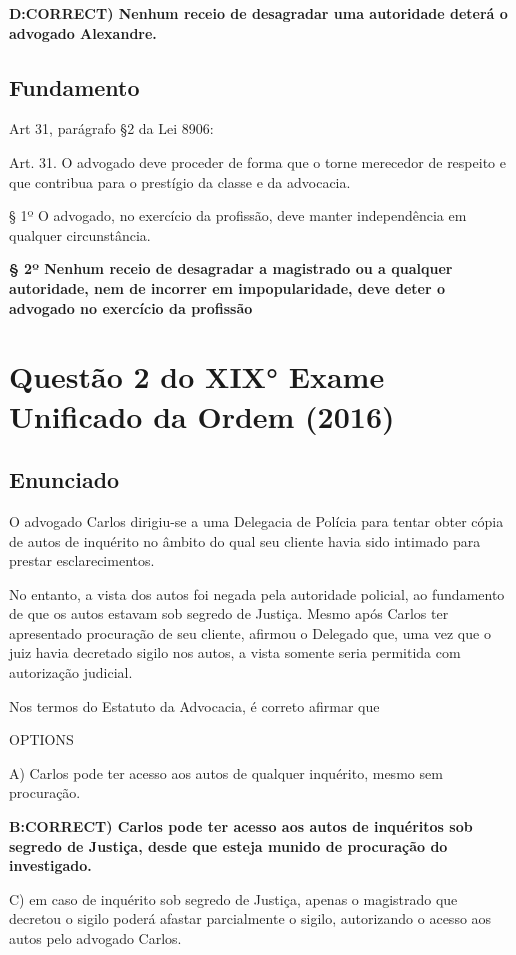 \documentclass[12pt]{article}
\begin{document}
\textbf{D:CORRECT) Nenhum receio de desagradar uma autoridade deterá o 
advogado Alexandre. }

\subsection{Fundamento}

Art 31, parágrafo §2 da Lei 8906:

Art. 31. O advogado deve proceder de forma que o torne merecedor de respeito e que contribua para o prestígio da classe e da advocacia.

§ 1º O advogado, no exercício da profissão, deve manter independência em qualquer circunstância.

\textbf{§ 2º Nenhum receio de desagradar a magistrado ou a qualquer autoridade, nem de incorrer em impopularidade, deve deter o advogado no exercício da profissão}


\section{Questão 2 do XIX° Exame Unificado da Ordem (2016)}

\subsection{Enunciado}


O advogado Carlos dirigiu-se a uma Delegacia de Polícia para 
tentar obter cópia de autos de inquérito no âmbito do qual 
seu cliente havia sido intimado para prestar esclarecimentos. 

No entanto, a vista dos autos foi negada pela autoridade 
policial, ao fundamento de que os autos estavam sob segredo 
de Justiça. Mesmo após Carlos ter apresentado procuração de 
seu cliente, afirmou o Delegado que, uma vez que o juiz havia 
decretado sigilo nos autos, a vista somente seria permitida 
com autorização judicial. 
 
Nos termos do Estatuto da Advocacia, é correto afirmar que 
 
OPTIONS

A) Carlos pode ter acesso aos autos de qualquer inquérito, 
mesmo sem procuração. 

\textbf{B:CORRECT) Carlos pode ter acesso aos autos de inquéritos sob segredo de Justiça, desde que esteja munido de procuração do 
investigado. }

C) em caso de inquérito sob segredo de Justiça, apenas o 
magistrado que decretou o sigilo poderá afastar 
parcialmente o sigilo, autorizando o acesso aos autos pelo 
advogado Carlos. 
\end{document}
